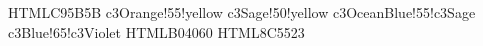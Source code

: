 \definecolor{c3Coral} {HTML}{C95B5B}%
   {c3Orange!55!yellow}%
  {c3Sage!50!yellow}%
   {c3OceanBlue!55!c3Sage}%
 {c3Blue!65!c3Violet}%
\definecolor{c3Berry} {HTML}{B04060}%
\definecolor{c3Cocoa} {HTML}{8C5523}%
%
